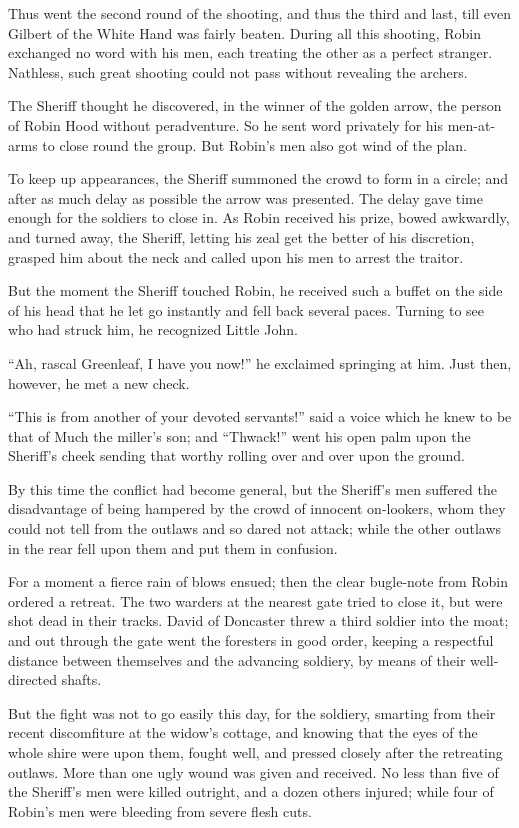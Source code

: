 Thus went the second round of the shooting, and thus the third and last,
till even Gilbert of the White Hand was fairly beaten. During all this
shooting, Robin exchanged no word with his men, each treating the other
as a perfect stranger. Nathless, such great shooting could not pass
without revealing the archers.

The Sheriff thought he discovered, in the winner of the golden arrow,
the person of Robin Hood without peradventure. So he sent word privately
for his men-at-arms to close round the group. But Robin's men also got
wind of the plan.

To keep up appearances, the Sheriff summoned the crowd to form in a
circle; and after as much delay as possible the arrow was presented. The
delay gave time enough for the soldiers to close in. As Robin received
his prize, bowed awkwardly, and turned away, the Sheriff, letting his
zeal get the better of his discretion, grasped him about the neck and
called upon his men to arrest the traitor.

But the moment the Sheriff touched Robin, he received such a buffet on
the side of his head that he let go instantly and fell back several
paces. Turning to see who had struck him, he recognized Little John.

``Ah, rascal Greenleaf, I have you now!'' he exclaimed springing at him.
Just then, however, he met a new check.

``This is from another of your devoted servants!'' said a voice which he
knew to be that of Much the miller's son; and ``Thwack!'' went his open
palm upon the Sheriff's cheek sending that worthy rolling over and over
upon the ground.

By this time the conflict had become general, but the Sheriff's men
suffered the disadvantage of being hampered by the crowd of innocent
on-lookers, whom they could not tell from the outlaws and so dared not
attack; while the other outlaws in the rear fell upon them and put them
in confusion.

For a moment a fierce rain of blows ensued; then the clear bugle-note
from Robin ordered a retreat. The two warders at the nearest gate tried
to close it, but were shot dead in their tracks. David of Doncaster
threw a third soldier into the moat; and out through the gate went the
foresters in good order, keeping a respectful distance between
themselves and the advancing soldiery, by means of their well-directed
shafts.

But the fight was not to go easily this day, for the soldiery, smarting
from their recent discomfiture at the widow's cottage, and knowing that
the eyes of the whole shire were upon them, fought well, and pressed
closely after the retreating outlaws. More than one ugly wound was given
and received. No less than five of the Sheriff's men were killed
outright, and a dozen others injured; while four of Robin's men were
bleeding from severe flesh cuts.

